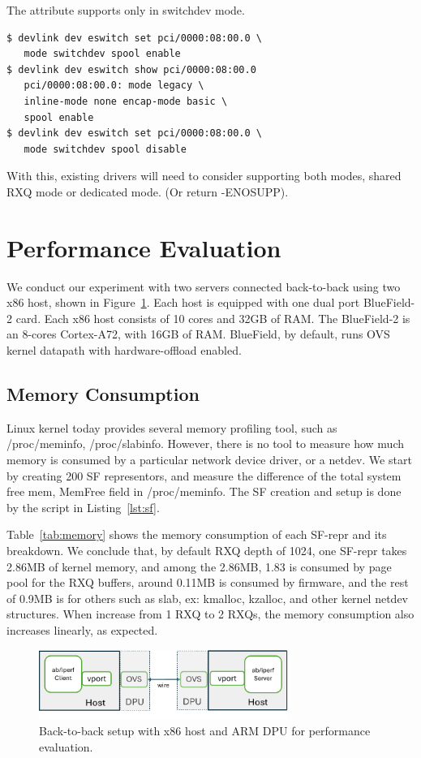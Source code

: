 \documentclass[letterpaper]{article}
\begin{document}
The attribute supports only in switchdev mode.
\begin{verbatim}
$ devlink dev eswitch set pci/0000:08:00.0 \
   mode switchdev spool enable
$ devlink dev eswitch show pci/0000:08:00.0
   pci/0000:08:00.0: mode legacy \
   inline-mode none encap-mode basic \
   spool enable
$ devlink dev eswitch set pci/0000:08:00.0 \
   mode switchdev spool disable
\end{verbatim}

With this, existing drivers will need to consider supporting both
modes, shared RXQ mode or dedicated mode. (Or return -ENOSUPP).

\section{Performance Evaluation}

We conduct our experiment with two servers connected back-to-back using
two x86 host, shown in Figure~\ref{fig:testbed}.
Each host is equipped with one dual port BlueField-2 card.
Each x86 host consists of 10 cores and 32GB of RAM. The BlueField-2
is an 8-cores Cortex-A72, with 16GB of RAM. BlueField, by default, runs OVS kernel
datapath with hardware-offload enabled.

\subsection{Memory Consumption}
Linux kernel today provides several memory profiling tool, such as /proc/meminfo,
/proc/slabinfo. However, there is no tool to measure how much memory is consumed
by a particular network device driver, or a netdev. We start by creating 200 SF representors,
and measure the difference of the total system free mem, MemFree field in /proc/meminfo.
The SF creation and setup is done by the script in Listing~\ref{lst:sf}.

Table~\ref{tab:memory} shows the memory consumption of each SF-repr and its breakdown.
We conclude that, by default RXQ depth of 1024, one SF-repr takes 2.86MB of kernel
memory, and among the 2.86MB, 1.83 is consumed by page pool for the RXQ buffers,
around 0.11MB is consumed by firmware, and the rest of 0.9MB is for others
such as slab, ex: kmalloc, kzalloc, and other kernel netdev structures.
When increase from 1 RXQ to 2 RXQs, the memory consumption also increases linearly, as expected.
\begin{figure}[t!]
\includegraphics[width=3.2in]{testbed.pdf}
\centering
\caption{Back-to-back setup with x86 host and ARM DPU for performance evaluation.}
\label{fig:testbed}
\end{figure}
\end{document}
